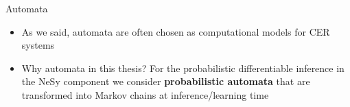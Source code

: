 \documentclass[10pt, aspectratio=169]{beamer}
\begin{document}
\begin{frame}{Automata}
    \begin{itemize}
        \setlength{\itemsep}{13pt}
        \item As we said, automata are often chosen as computational models for CER systems
        \item \textcolor{umBlueLighter}{Why automata in this thesis?} For the probabilistic differentiable inference in the NeSy component we consider \textbf{probabilistic automata} that are transformed into Markov chains at inference/learning time
    \end{itemize}
\end{frame}

\end{document}
